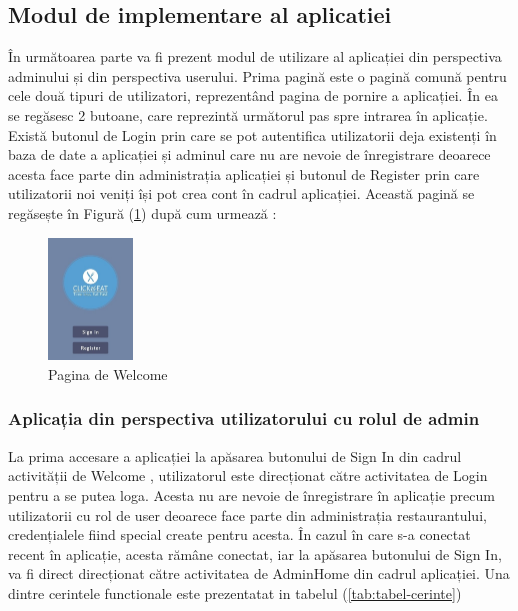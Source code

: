 \documentclass[a4paper,12pt]{book}
\begin{document}
\subsection{Modul de implementare al aplicatiei}
În următoarea parte va fi prezent modul de utilizare al aplicației din perspectiva 
adminului și din perspectiva userului.
Prima pagină este o pagină comună pentru cele două tipuri de utilizatori, 
reprezentând pagina de pornire a aplicației. În ea se regăsesc 2 butoane, care reprezintă 
următorul pas spre intrarea în aplicație. Există butonul de Login prin care se pot 
autentifica utilizatorii deja existenți în baza de date a aplicației și adminul care nu are 
nevoie de înregistrare deoarece acesta face parte din administrația aplicației și butonul 
de Register prin care utilizatorii noi veniți își pot crea cont în cadrul aplicației. Această 
pagină se regăsește în Figură (\ref{fig:welcome}) după cum urmează :

\begin{figure}[ht]
\centering
  \includegraphics[width=0.2\textwidth]{poza5.jpg}
  \caption{Pagina de Welcome}
  \label{fig:welcome}
\end{figure}

\subsubsection{Aplicația din perspectiva utilizatorului cu rolul de admin}
La prima accesare a aplicației la apăsarea butonului de Sign In din cadrul activității de Welcome , utilizatorul este direcționat către activitatea de Login  pentru a se putea loga. Acesta nu are nevoie de înregistrare în aplicație precum utilizatorii cu rol de user deoarece face parte din administrația restaurantului, credențialele fiind special create pentru acesta. În cazul în care s-a conectat recent în aplicație, acesta rămâne conectat, iar la apăsarea butonului de Sign In, va fi direct direcționat către activitatea de AdminHome din cadrul aplicației.
Una dintre cerintele functionale \cite{city} este prezentatat in tabelul (\ref{tab:tabel-cerinte})
\end{document}
